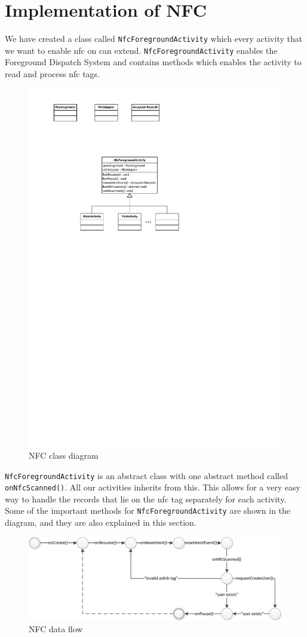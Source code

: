 \section{Implementation of NFC}
We have created a class called \lstinline|NfcForegroundActivity| which every activity that we want to enable \ac{nfc} on can extend. \lstinline|NfcForegroundActivity| enables the Foreground Dispatch System and contains methods which enables the activity to read and process \ac{nfc} tags.

\begin{figure}[H]
\centering
\includegraphics[width=0.55\linewidth, page=2]{img/nfcdiagram.pdf}
\caption{NFC class diagram}
\label{fig:nfcdiagram}
\end{figure}

\lstinline|NfcForegroundActivity| is an abstract class with one abstract method called \lstinline|onNfcScanned()|. All our activities inherits from this. This allows for a very easy way to handle the records that lie on the \ac{nfc} tag separately for each activity. Some of the important methods for \lstinline|NfcForegroundActivity| are shown in the diagram, and they are also explained in this section.

\begin{figure}[H]
\centering
\includegraphics[width=\linewidth]{img/nfcdataflow.pdf}
\caption{NFC data flow}
\label{fig:nfcdataflow}
\end{figure}


